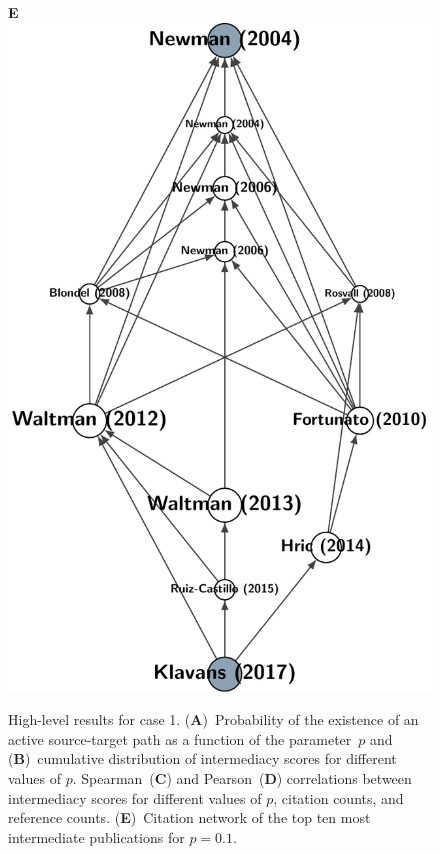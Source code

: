 \documentclass[9pt,twocolumn,twoside,lineno]{pnas-alt}
\theoremstyle{definition}
\begin{document}
\begin{sansmath}
\begin{figure}
\begin{minipage}{7.4cm}
  \end{minipage}\linewidth%
  \begin{minipage}{4cm}
    \vskip16pt\hskip16pt\textbf{\textsf{\footnotesize E}}\\\vskip-32pt%
    \includegraphics[width=\linewidth]{example_Q}
  \end{minipage}
  \caption{High-level results for case 1. (\textbf{A})~Probability of the existence of an active source-target path as a function of the parameter~$p$ and (\textbf{B})~cumulative distribution of intermediacy scores for different values of $p$. Spearman~(\textbf{C}) and Pearson~(\textbf{D}) correlations between intermediacy scores for different values of $p$, citation counts, and reference counts. (\textbf{E})~Citation network of the top ten most intermediate publications for $p = 0.1$.}
  \label{fig:Q}
\end{figure}\end{sansmath}
\end{document}
